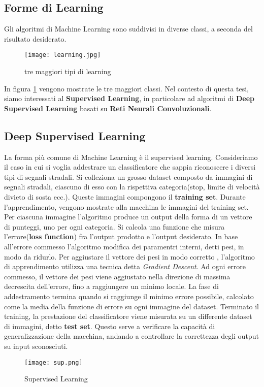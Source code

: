 \subsection{Forme di Learning}
Gli algoritmi di Machine Learning sono suddivisi in diverse classi, a seconda del risultato desiderato.
\begin{figure}
  \texttt{[image: learning.jpg]}
  \caption{tre maggiori tipi di learning\cite{learn}}
  \label{fig:ml}
\end{figure}
In figura \ref{fig:ml} vengono mostrate le tre maggiori classi. Nel contesto di questa tesi, siamo interessati  al \textbf{Supervised Learning}, in particolare
ad algoritmi di \textbf{Deep Supervised Learning} basati su \textbf{Reti Neurali Convoluzionali}.
\subsection{Deep Supervised Learning}
La forma più comune di Machine Learning è il supervised learning. Consideriamo il caso in cui si voglia addestrare un classificatore
che sappia riconoscere i diversi tipi di segnali stradali. Si colleziona un grosso dataset composto da immagini di segnali stradali, ciascuno di esso con la rispettiva categoria(stop, limite di velocità
divieto di sosta ecc.). Queste immagini compongono il \textbf{training set}. Durante l'apprendimento, vengono mostrate alla macchina  le immagini del training set. Per ciascuna immagine l'algoritmo produce un output della forma di un vettore di punteggi, uno per ogni categoria.
Si calcola una funzione che misura l'errore(\textbf{loss function}) fra l'output prodotto e l'output desiderato. In base all'errore commesso l'algoritmo modifica dei paramentri interni, detti pesi, 
in modo da ridurlo. Per aggiustare il vettore dei pesi in modo corretto , l'algoritmo di apprendimento utilizza una tecnica detta \emph{Gradient Descent}. Ad ogni errore commesso, il vettore dei pesi viene aggiustato nella direzione di massima decrescita dell'errore, fino a raggiungere un minimo locale. La fase di addestramento termina quando si raggiunge il minimo errore possibile, calcolato come la media della funzione di errore su ogni immagine del dataset.
Terminato il training, la prestazione del classificatore viene misurata su un differente dataset di immagini, detto \textbf{test set}. Questo serve a verificare
la capacità di generalizzazione della macchina, andando a controllare la correttezza degli output su input sconosciuti.

\begin{figure}
  \texttt{[image: sup.png]}
  \caption{Supervised Learning\cite{sup}}
  \label{fig:sup}
\end{figure}

